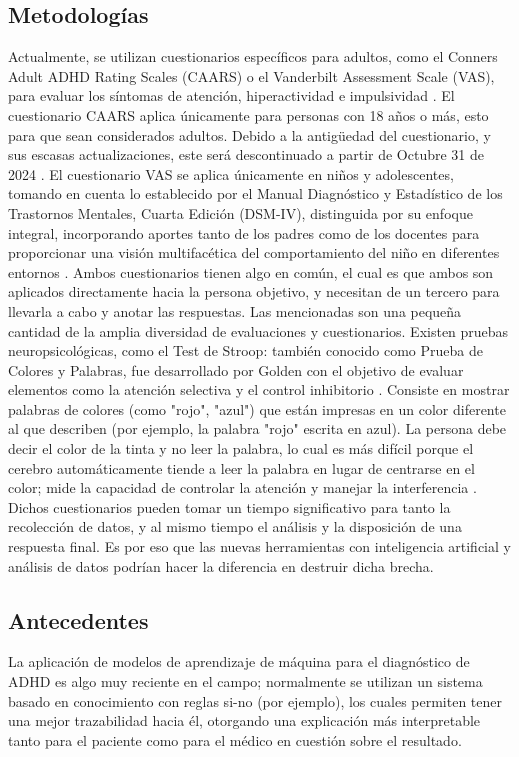 \documentclass[10pt,journal,compsoc]{IEEEtran}
\begin{document}
\subsection{Metodologías}
Actualmente, se utilizan cuestionarios específicos para adultos, como el Conners Adult ADHD Rating Scales (CAARS) o el Vanderbilt Assessment Scale (VAS), para evaluar los síntomas de atención, hiperactividad e impulsividad \cite{review2003neuropsychology}. El cuestionario CAARS aplica únicamente para personas con 18 años o más, esto para que sean considerados adultos. Debido a la antigüedad del cuestionario, y sus escasas actualizaciones, este será descontinuado a partir de Octubre 31 de 2024 \cite{scales2024adult}. El cuestionario VAS se aplica únicamente en niños y adolescentes, tomando en cuenta lo establecido por el Manual Diagnóstico y Estadístico de los Trastornos Mentales, Cuarta Edición (DSM-IV), distinguida por su enfoque integral, incorporando aportes tanto de los padres como de los docentes para proporcionar una visión multifacética del comportamiento del niño en diferentes entornos \cite{vanderbilt2024tools}. Ambos cuestionarios tienen algo en común, el cual es que ambos son aplicados directamente hacia la persona objetivo, y necesitan de un tercero para llevarla a cabo y anotar las respuestas. Las mencionadas son una pequeña cantidad de la amplia diversidad de evaluaciones y cuestionarios. Existen pruebas neuropsicológicas, como el Test de Stroop: también conocido como Prueba de Colores y Palabras, fue desarrollado por Golden con el objetivo de evaluar elementos como la atención selectiva y el control inhibitorio \cite{mente2024conners}. 
Consiste en mostrar palabras de colores (como "rojo", "azul") que están impresas en un color diferente al que describen (por ejemplo, la palabra "rojo" escrita en azul). La persona debe decir el color de la tinta y no leer la palabra, lo cual es más difícil porque el cerebro automáticamente tiende a leer la palabra en lugar de centrarse en el color; mide la capacidad de controlar la atención y manejar la interferencia \cite{test2024stroop}.
Dichos cuestionarios pueden tomar un tiempo significativo para tanto la recolección de datos, y al mismo tiempo el análisis y la disposición de una respuesta final. Es por eso que las nuevas herramientas con inteligencia artificial y análisis de datos podrían hacer la diferencia en destruir dicha brecha.

\subsection{Antecedentes}
La aplicación de modelos de aprendizaje de máquina para el diagnóstico de ADHD es algo muy reciente en el campo; normalmente se utilizan un sistema basado en conocimiento con reglas si-no (por ejemplo), los cuales permiten tener una mejor trazabilidad hacia él, otorgando una explicación más interpretable tanto para el paciente como para el médico en cuestión sobre el resultado.
\end{document}
